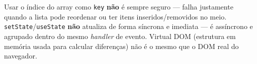 \begin{cuidado}
Usar o índice do array como \texttt{key} \textbf{não} é sempre seguro ---
falha justamente quando a lista pode reordenar ou ter itens
inseridos/removidos no meio. \texttt{setState}/\texttt{useState}
\textbf{não} atualiza de forma síncrona e imediata --- é assíncrono e
agrupado dentro do mesmo \textit{handler} de evento. Virtual DOM
(estrutura em memória usada para calcular diferenças) não é o mesmo que
o DOM real do navegador.
\end{cuidado}
